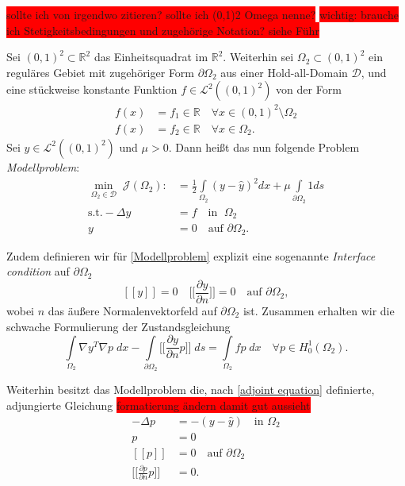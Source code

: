 \colorbox{red}{sollte ich von irgendwo zitieren? sollte ich (0,1)2 Omega nenne?}
\colorbox{red}{ wichtig: brauche ich Stetigkeitsbedingungen und zugehörige Notation? siehe Führ}
\begin{defi}[Modellproblem]
	Sei $(0,1)^2 \subset \mathbb{R}^2$ das Einheitsquadrat im $\mathbb{R}^2$.
	Weiterhin sei $\Omega_2 \subset (0,1)^2$ ein reguläres Gebiet mit zugehöriger 		Form $\partial\Omega_2$ aus einer Hold-all-Domain $\mathcal{D}$, und eine stückweise konstante Funktion $f \in \mathcal{L}^2((0,1)^2)$ von der Form
	\begin{align*}
		f(x) &= f_1 \in \mathbb{R} \quad \forall x \in (0,1)^2\setminus \Omega_2 \\
		f(x) &= f_2 \in \mathbb{R} \quad \forall x \in \Omega_2.
	\end{align*}
	Sei $\hat{y} \in \mathcal{L}^2((0,1)^2)$ und $\mu > 0$. Dann heißt das nun folgende Problem \textit{Modellproblem}:
	\begin{equation}\label{Modellproblem}
	\begin{aligned}
	\underset{\Omega_2\in \mathcal{D}}{\min}\; \mathcal{J}(\Omega_2) :&= \frac{1}{2}\underset{\Omega_2}{\int} (y - \hat{y})^2 dx + \mu\underset{\partial\Omega_2}{\int} 1 ds \\
	\text{s.t.} -\Delta y &= f \quad \text{in } \;\Omega_2 \\
	y &= 0  \quad \text{auf } \partial\Omega_2.
	\end{aligned}
	\end{equation}		
	
	Zudem definieren wir für \ref{Modellproblem} explizit eine sogenannte \textit{Interface condition} auf $\partial\Omega_2$
	\begin{equation}\label{Interfacecondition}
		[[y]] = 0 \quad \Big[\Big[\frac{\partial y}{\partial n}\Big]\Big] = 0 \quad \text{auf } \partial \Omega_2,
	\end{equation}
	wobei $n$ das äußere Normalenvektorfeld auf $\partial\Omega_2$ ist.	Zusammen erhalten wir die schwache Formulierung der Zustandsgleichung
	\begin{equation}
		\underset{\Omega_2}{\int} \nabla y^T \nabla p\; dx - \underset{\partial\Omega_2}{\int} \Big[\Big[ \frac{\partial y}{\partial n}p\Big]\Big]\;ds = \underset{\Omega_2}{\int} fp \;dx \quad \forall p \in H^1_0(\Omega_2).
	\end{equation}
	
	Weiterhin besitzt das Modellproblem die, nach \ref{adjoint equation} 				definierte, adjungierte Gleichung \colorbox{red}{formatierung ändern damit gut aussieht}
	\begin{align*}\label{Modelladjoint}
		-\Delta p &= - (y - \hat{y}) \quad \text{in } \Omega_2 \\
		p &= 0 \\
		[[p]] &= 0 \quad \text{auf } \partial\Omega_2 \\ 
		\Big[\Big[\frac{\partial p}{\partial n}p\Big]\Big] &= 0 .
	\end{align*}	 
\end{defi}

